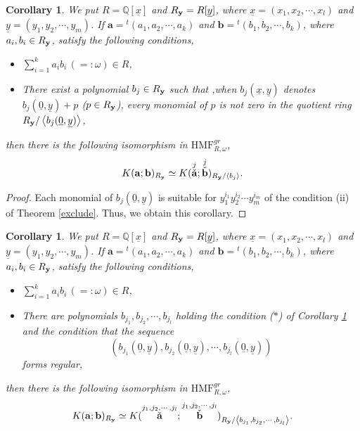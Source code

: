 \documentclass[10pt]{amsart}
\theoremstyle{break}
\newtheorem{cor}[de]{Corollary}
\begin{document}
\begin{cor}\label{cor2-10}
We put $R={{\mathbb{Q}}} [\underline{x}]$ and $R_{\bf y} = R [\underline{y}]$, where $\underline{x}=(x_1,x_2,\cdots ,x_l)$ and $\underline{y}=(y_1,y_2,\cdots ,y_m)$. 
If $\mathbf{a}={}^t( a_1 , a_2 , \cdots , a_k )$ and $\mathbf{b}={}^t( b_1 , b_2 , \cdots , b_k )$, where $a_i ,b_i \in R_{\bf y}$, satisfy the following conditions,
\begin{itemize}
\item[(i)] $\sum_{i=1}^{k}a_i b_i \,(=:\omega) \in R$,\\
\item[($\ast$)] There exist a polynomial $b_j\in R_{\bf y}$ such that ,when $b_j(\underline{x},\underline{y})$ denotes $b_j(\underline{0},\underline{y}) + p$ ($p\in R_{\bf y}$), every monomial of $p$ is not zero in the quotient ring $R_{\bf y}/\left< b_j(\underline{0},\underline{y}) \right>$,
\end{itemize}
then there is the following isomorphism in ${{\mathrm{HMF}}}^{gr}_{R,\omega }$,
$$
K(\mathbf{a};\mathbf{b})_{R_{\bf y}} \simeq K(\stackrel{j}{\check{\mathbf{a}}};\stackrel{j}{\check{\mathbf{b}}})_{R_{\bf y}/\left< b_j\right> }.
$$
\end{cor}
\begin{proof}
Each monomial of $b_j(\underline{0},\underline{y})$ is suitable for $y_1^{i_1}y_2^{i_2}\cdots y_m^{i_m}$ of the condition (ii) of Theorem \ref{exclude}. Thus, we obtain this corollary.
\end{proof}

\begin{cor}\label{cor2-11}
We put $R={{\mathbb{Q}}} [\underline{x}]$ and $R_{\bf y} = R [\underline{y}]$, where $\underline{x}=(x_1,x_2,\cdots ,x_l)$ and $\underline{y}=(y_1,y_2,\cdots ,y_m)$. 
If $\mathbf{a}={}^t( a_1 , a_2 , \cdots , a_k )$ and $\mathbf{b}={}^t( b_1 , b_2 , \cdots , b_k )$, where $a_i ,b_i \in R_{\bf y}$, satisfy the following conditions,
\begin{itemize}
\item[(i)] $\sum_{i=1}^{k}a_i b_i \,(=:\omega) \in R$,\\
\item[(ii)] There are polynomials $b_{j_1},b_{j_2},\cdots ,b_{j_l}$ holding the condition {\rm ($\ast$)} of Corollary \ref{cor2-10} and the condition that the sequence $$(b_{j_1}(\underline{0},\underline{y}),b_{j_2}(\underline{0},\underline{y}),\cdots ,b_{j_l}(\underline{0},\underline{y}))$$ forms regular,
\end{itemize}
then there is the following isomorphism in ${{\mathrm{HMF}}}^{gr}_{R,\omega }$,
$$
K(\mathbf{a};\mathbf{b})_{R_{\bf y}} 
\simeq K(\stackrel{j_1,j_2,\cdots ,j_l}{\check{\mathbf{a}}};\stackrel{j_1,j_2,\cdots ,j_l}{\check{\mathbf{b}}})_{R_{\bf y}/\left< b_{j_1},b_{j_2},\cdots ,b_{j_l}\right> }.
$$
\end{cor}
\end{document}
